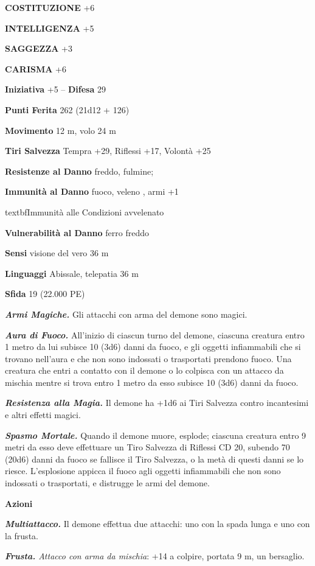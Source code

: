 \begin{multicols}{2}
\textbf{COSTITUZIONE} +6

\textbf{INTELLIGENZA} +5

\textbf{SAGGEZZA} +3

\textbf{CARISMA} +6

\textbf{Iniziativa} +5 -- \textbf{Difesa} 29

\textbf{Punti Ferita} 262 (21d12 + 126)

\textbf{Movimento} 12 m, volo 24 m

\textbf{Tiri Salvezza} Tempra +29, Riflessi +17, Volontà +25

\textbf{Resistenze al Danno} freddo, fulmine; 

\textbf{Immunità al Danno} fuoco, veleno , armi +1

textbf{Immunità alle Condizioni} avvelenato

\textbf{Vulnerabilità al Danno} ferro freddo

\textbf{Sensi} visione del vero 36 m

\textbf{Linguaggi} Abissale, telepatia 36 m

\textbf{Sfida} 19 (22.000 PE)

\emph{\textbf{Armi Magiche.}} Gli attacchi con arma del demone sono magici.

\emph{\textbf{Aura di Fuoco.}} All'inizio di ciascun turno del demone, ciascuna creatura entro 1 metro da lui subisce 10 (3d6) danni da fuoco, e gli oggetti infiammabili che si trovano nell'aura e che non sono indossati o trasportati prendono fuoco. Una creatura che entri a contatto con il demone o lo colpisca con un attacco da mischia mentre si trova entro 1 metro da esso subisce 10 (3d6) danni da fuoco.

\emph{\textbf{Resistenza alla Magia.}} Il demone ha +1d6 ai Tiri Salvezza contro incantesimi e altri effetti magici.

\emph{\textbf{Spasmo Mortale.}} Quando il demone muore, esplode; ciascuna creatura entro 9 metri da esso deve effettuare un Tiro Salvezza di Riflessi CD 20, subendo 70 (20d6) danni da fuoco se fallisce il Tiro Salvezza, o la metà di questi danni se lo riesce. L'esplosione appicca il fuoco agli oggetti infiammabili che non sono indossati o trasportati, e distrugge le armi del demone.

\textbf{Azioni}

\emph{\textbf{Multiattacco.}} Il demone effettua due attacchi: uno con la spada lunga e uno con la frusta.

\emph{\textbf{Frusta.} Attacco con arma da mischia}: +14 a colpire, portata 9 m, un bersaglio.


\end{multicols}
